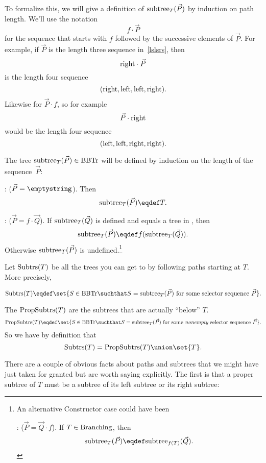 \begin{definition}
To formalize this, we will give a definition of $\text{subtree}_{T}(\vec{P})$
by induction on path length.  We'll use the notation
\[
f \cdot \vec{P}
\]
for the sequence that starts with $f$ followed by the successive
elements of $\vec{P}$.  For example, if $\vec{P}$ is the length three
sequence in~\eqref{lslsrs}, then
\[
\text{right} \cdot \vec{P}
\]
is the length four sequence
\[
(\text{right}, \text{left},\text{left},\text{right}).
\]
Likewise for $\vec{P} \cdot f$, so for example
\[
 \vec{P} \cdot \text{right}
\]
would be the length four sequence
\[
(\text{left},\text{left},\text{right},\text{right}).
\]

\begin{definition}
The tree $\text{subtree}_{T}(\vec{P}) \in \text{BBTr}$ will be defined by induction
on the length of the sequence~$\vec{P}$:

: ($\vec{P} = \emptystring$).
Then
\[
\rslt{T}{(\vec{P})} \eqdef T.
\]

: ($\vec{P} = f \cdot \vec{Q}$).  If
$\text{subtree}_{T}(\vec{Q})$ is defined and equals a tree in \brnchng, then
\[
\rslt{T}{(\vec{P})} \eqdef f(\rslt{T}{(\vec{Q})}).
\]
Otherwise $\text{subtree}_{T}(\vec{P})$ is undefined.\footnote{An alternative
  Constructor case could have been

: ($\vec{P} = \vec{Q} \cdot f$).  If
$T \in \text{Branching}$, then
\[
\rslt{T}{(\vec{P})} \eqdef \rslt{f(T)}{(\vec{Q})}.
\]}

\end{definition}
\medskip

Let $\text{Subtrs}(T)$ be all the trees you can get to by following paths
starting at $T$.  More precisely,
\begin{definition}\label{def:subtree}
\[
\subbrn{T} \eqdef \set{S \in \brnch \suchthat S =
  \rslt{T}{(\vec{P})}\ \text{for some selector sequence}\ \vec{P}}.
\]
\end{definition}

The  $\text{PropSubtrs}(T)$ are the subtrees that are
actually ``below'' $T$.
\[
\propbrn{T} \eqdef \set{S \in \brnch \suchthat S =
  \rslt{T}{(\vec{P})}\ \text{for some \emph{nonempty} selector
    sequence}\ \vec{P}}.
\]
So we have by definition that
\begin{equation}\label{subtree-proptree}
\subbrn{T} = \propbrn{T} \union \set{T}.
\end{equation}

There are a couple of obvious facts about paths and subtrees that we
might have just taken for granted but are worth saying explicitly.
The first is that a proper subtree of $T$ must be a subtree of its
left subtree or its right subtree:


\end{definition}
